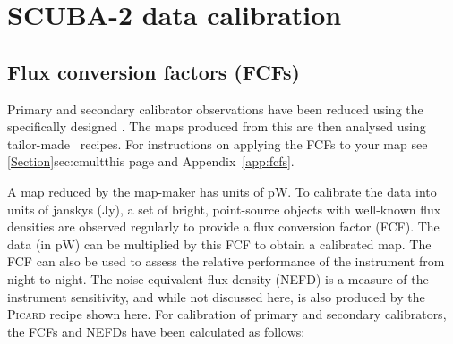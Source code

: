 \chapter{SCUBA-2 data calibration}
\label{app:cal}

\section{Flux conversion factors (FCFs)}
\label{app:fcf}

Primary and secondary calibrator observations have been reduced using
the specifically designed .  The
maps produced from this are then analysed using tailor-made \picard\
recipes. For instructions on applying the FCFs to your map see
\cref{Section}{sec:cmult}{this page} and Appendix~\ref{app:fcfs}.

A map reduced by the map-maker has units of pW. To calibrate the data
into units of janskys (Jy), a set of bright, point-source objects with
well-known flux densities are observed regularly to provide a flux
conversion factor (FCF). The data (in pW) can be multiplied by this
FCF to obtain a calibrated map. The FCF can also be used to assess the
relative performance of the instrument from night to night. The noise
equivalent flux density (NEFD) is a measure of the instrument
sensitivity, and while not discussed here, is also produced by the
\textsc{Picard} recipe shown here. For calibration of primary and
secondary calibrators, the FCFs and NEFDs have been calculated as
follows:

